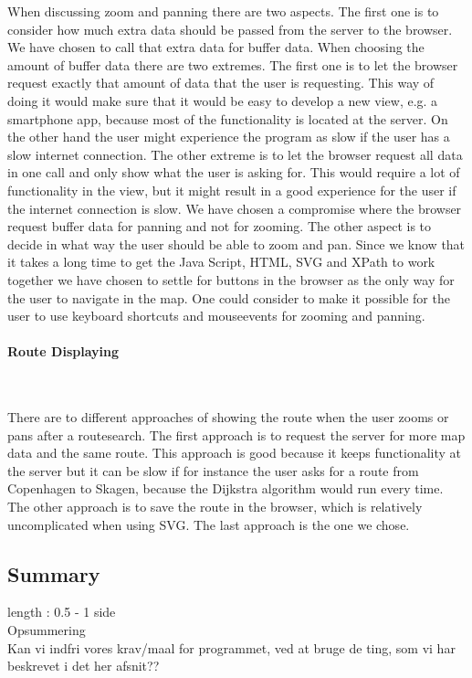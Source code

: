 \documentclass[a4paper,10pt,titlepage]{article}
\begin{document}
When discussing zoom and panning there are two aspects. The first one is to consider how much extra data should be passed from the server to the browser. We have chosen to call that extra data for buffer data. When choosing the amount of buffer data there are two extremes. The first one is to let the browser request exactly that amount of data that the user is requesting. This way of doing it would make sure that it would be easy to develop a new view, e.g. a smartphone app, because most of the functionality is located at the server. On the other hand the user might experience the program as slow if the user has a slow internet connection. The other extreme is to let the browser request all data in one call and only show what the user is asking for. This would require a lot of functionality in the view, but it might result in a good experience for the user if the internet connection is slow. We have chosen a compromise where the browser request buffer data for panning and not for zooming.
The other aspect is to decide in what way the user should be able to zoom and pan. Since we know that it takes a long time to get the Java Script, HTML, SVG and XPath to work together we have chosen to settle for buttons in the browser as the only way for the user to navigate in the map. One could consider to make it possible for the user to use keyboard shortcuts and mouseevents for zooming and panning. 

\paragraph{Route Displaying}\mbox{}\

There are to different approaches of showing the route when the user zooms or pans after a routesearch. The first approach is to request the server for more map data and the same route. This approach is good because it keeps functionality at the server but it can be slow if for instance the user asks for a route from Copenhagen to Skagen, because the Dijkstra algorithm would run every time. The other approach is to save the route in the browser, which is relatively uncomplicated when using SVG. The last approach is the one we chose.	

				
				
		\subsection{Summary}
			length : 0.5 - 1 side\\
			Opsummering\\
			Kan vi indfri vores krav/maal for programmet, ved at bruge de ting, som vi har beskrevet i det her afsnit??\\
\end{document}
